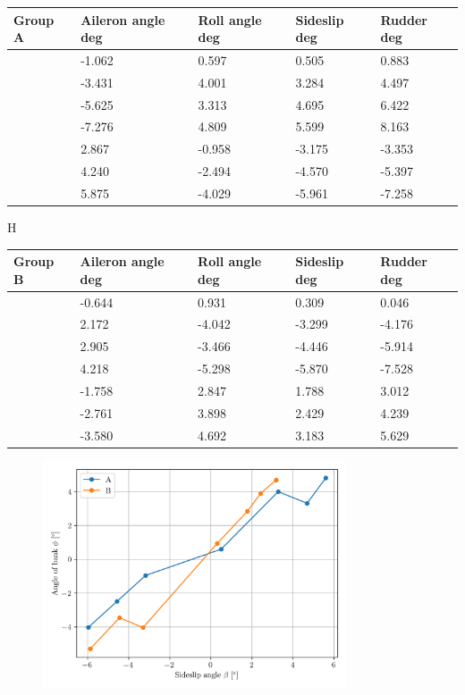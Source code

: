 \documentclass{article}
\begin{document}
\begin{table}[H]
    \centering
    \begin{tabular}{lllll}
        \toprule
        Group A & Aileron angle deg & Roll angle deg & Sideslip deg & Rudder deg \\
        \midrule
        & -1.062 & 0.597 & 0.505 & 0.883 \\
        & -3.431 & 4.001 & 3.284 & 4.497 \\
        & -5.625 & 3.313 & 4.695 & 6.422 \\
        & -7.276 & 4.809 & 5.599 & 8.163 \\
        & 2.867 & -0.958 & -3.175 & -3.353 \\
        & 4.240 & -2.494 & -4.570 & -5.397 \\
        & 5.875 & -4.029 & -5.961 & -7.258 \\
        \bottomrule
        \end{tabular}
\end{table}
\begin{table}{H}
    \centering
        \begin{tabular}{lllll}
        \toprule
        Group B & Aileron angle deg & Roll angle deg & Sideslip deg & Rudder deg \\
        \midrule
        & -0.644 & 0.931 & 0.309 & 0.046 \\
        & 2.172 & -4.042 & -3.299 & -4.176 \\
        & 2.905 & -3.466 & -4.446 & -5.914 \\
        & 4.218 & -5.298 & -5.870 & -7.528 \\
        & -1.758 & 2.847 & 1.788 & 3.012 \\
        & -2.761 & 3.898 & 2.429 & 4.239 \\
        & -3.580 & 4.692 & 3.183 & 5.629 \\
        \bottomrule
        \end{tabular}
\end{table}

\begin{figure}[H]
    \centering
    \includegraphics[width=0.8\textwidth]{Lat_Directional_Static_Stability_SHSS_1.png}
    \caption{}
    \label{fig:Lat_Directional_Static_Stability_SHSS_1}
\end{figure}
\end{document}
